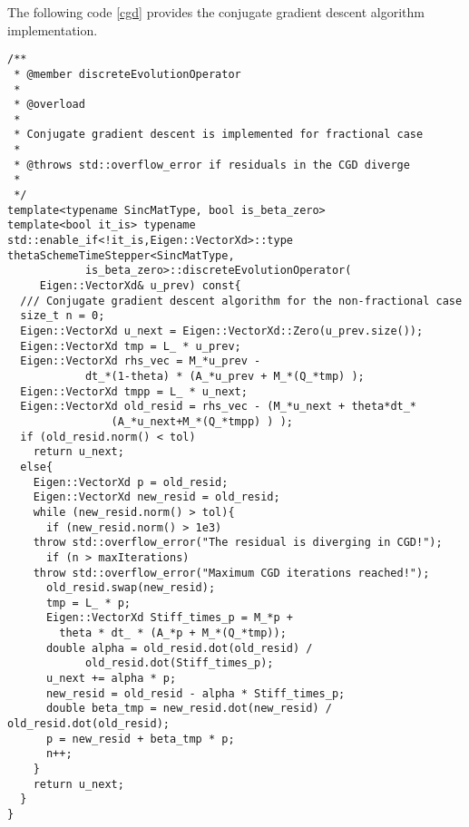 The following code \eqref{cgd} provides the conjugate gradient descent algorithm implementation.\\
\begin{lstlisting}[caption={The conjugate gradient descent.}, label={cgd}]
/** 
 * @member discreteEvolutionOperator
 *
 * @overload
 *
 * Conjugate gradient descent is implemented for fractional case
 *
 * @throws std::overflow_error if residuals in the CGD diverge
 *
 */
template<typename SincMatType, bool is_beta_zero> 
template<bool it_is> typename std::enable_if<!it_is,Eigen::VectorXd>::type
thetaSchemeTimeStepper<SincMatType,
  			is_beta_zero>::discreteEvolutionOperator(
     Eigen::VectorXd& u_prev) const{
  /// Conjugate gradient descent algorithm for the non-fractional case
  size_t n = 0; 
  Eigen::VectorXd u_next = Eigen::VectorXd::Zero(u_prev.size()); 
  Eigen::VectorXd tmp = L_ * u_prev;
  Eigen::VectorXd rhs_vec = M_*u_prev - 
    		dt_*(1-theta) * (A_*u_prev + M_*(Q_*tmp) ); 
  Eigen::VectorXd tmpp = L_ * u_next;
  Eigen::VectorXd old_resid = rhs_vec - (M_*u_next + theta*dt_*
      			(A_*u_next+M_*(Q_*tmpp) ) );
  if (old_resid.norm() < tol)
    return u_next; 
  else{
    Eigen::VectorXd p = old_resid; 
    Eigen::VectorXd new_resid = old_resid;
    while (new_resid.norm() > tol){
      if (new_resid.norm() > 1e3)
	throw std::overflow_error("The residual is diverging in CGD!");
      if (n > maxIterations)
	throw std::overflow_error("Maximum CGD iterations reached!");
      old_resid.swap(new_resid);  
      tmp = L_ * p; 
      Eigen::VectorXd Stiff_times_p = M_*p + 
		theta * dt_ * (A_*p + M_*(Q_*tmp)); 
      double alpha = old_resid.dot(old_resid) / 
			old_resid.dot(Stiff_times_p);
      u_next += alpha * p; 
      new_resid = old_resid - alpha * Stiff_times_p;
      double beta_tmp = new_resid.dot(new_resid) / old_resid.dot(old_resid); 
      p = new_resid + beta_tmp * p;
      n++; 
    }
    return u_next; 
  }
}

\end{lstlisting}
